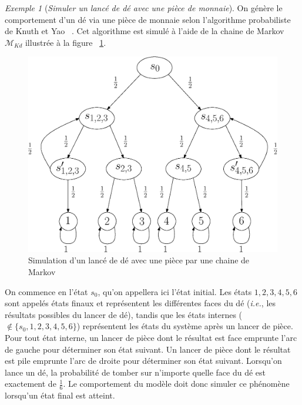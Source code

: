 \documentclass[12pt,a4paper]{report}
\theoremstyle{definition}%
\theoremstyle{remark}
\newtheorem{example}{Exemple}[chapter]
\newcommand{\ie}{\textit{i.e.}, }
\begin{document}
\begin{example} [\textit{Simuler un lancé de dé avec une pièce de monnaie}] \label{knuthdie}
	On génère le comportement d'un dé via une pièce de monnaie selon l'algorithme probabiliste de Knuth et Yao ~\cite{KY76}. Cet algorithme est simulé à l'aide de la chaine de Markov $\mathcal{M}_{Kd}$ illustrée à la figure ~\ref{diebyacoin}.
	\begin{figure}[H]
		\centering
		\includegraphics[scale=0.5]{figures/dieByaCoin.eps}
		\caption{Simulation d'un lancé de dé avec une pièce par une chaine de Markov}
		\label{diebyacoin}
	\end{figure}
	On commence en l'état $s_0$, qu'on appellera ici l'état initial. Les états $1, 2, 3, 4, 5, 6$ sont appelés états finaux et représentent les différentes faces du dé (\ie les résultats possibles du lancer de dé), tandis que les états internes ($\notin \{s_0, 1, 2, 3, 4, 5, 6\}$) représentent les états du système après un lancer de pièce.
	 Pour tout état interne, un lancer de pièce dont le résultat est face emprunte l'arc de gauche pour déterminer son état suivant. Un lancer de pièce dont le résultat est pile emprunte l'arc de droite pour déterminer son état suivant.	 Lorsqu'on lance un dé, la probabilité de tomber sur n'importe quelle face du dé est exactement de $\frac{1}{6}$. Le comportement du modèle doit donc simuler ce phénomène lorsqu'un état final est atteint.\\
	

\end{example}
\end{document}
